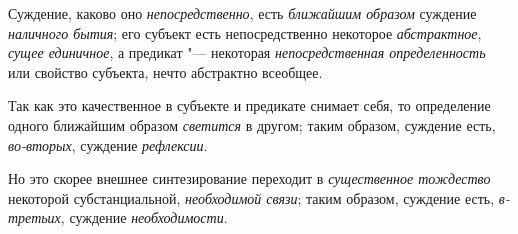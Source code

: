 Суждение, каково оно
{\em непосредственно},
есть {\em ближайшим
образом} суждение
{\em наличного бытия};
его субъект есть непосредственно некоторое
{\em абстрактное},
{\em сущее единичное}, а
предикат "--- некоторая
{\em непосредственная определенность}
или свойство субъекта, нечто абстрактно всеобщее.

Так как это качественное в субъекте и предикате снимает себя,
то определение одного ближайшим образом
{\em светится} в другом;
таким образом, суждение есть,
{\em во-вторых}, суждение
{\em рефлексии}.

Но это скорее внешнее
синтезирование
переходит в
{\em существенное тождество}
некоторой субстанциальной,
{\em необходимой связи};
таким образом, суждение есть,
{\em в-третьих}, суждение
{\em необходимости}.

